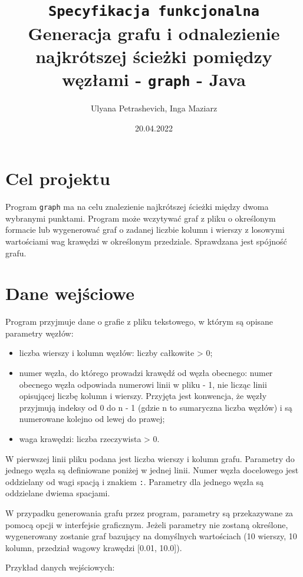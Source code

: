 \documentclass[]{article}
\title{\texttt{Specyfikacja funkcjonalna}\\Generacja grafu i odnalezienie najkrótszej ścieżki pomiędzy węzłami - \texttt{graph} - Java}
\author{Ulyana Petrashevich, Inga Maziarz}
\date{20.04.2022}
\begin{document}
\maketitle

\section{Cel projektu}\label{header-n231}

Program \texttt{graph} ma na celu znalezienie najkrótszej ścieżki między dwoma wybranymi punktami. Program może wczytywać graf z pliku o określonym formacie lub wygenerować graf o zadanej liczbie kolumn i wierszy z losowymi wartościami wag krawędzi w określonym przedziale. Sprawdzana jest spójność grafu.

\section{Dane wejściowe}\label{header-n233}

Program przyjmuje dane o grafie z pliku tekstowego, w którym są opisane parametry węzłów:

\begin{itemize}
\item
  liczba wierszy i kolumn węzłów: liczby całkowite \textgreater{} 0;
\item
  numer węzła, do którego prowadzi krawędź od węzła obecnego: numer obecnego węzła odpowiada numerowi linii w pliku - 1, nie licząc linii opisującej liczbę kolumn i wierszy. Przyjęta jest konwencja, że węzły przyjmują indeksy od 0 do n - 1 (gdzie n to sumaryczna liczba węzłów) i są numerowane kolejno od lewej do prawej; 
\item
  waga krawędzi: liczba rzeczywista \textgreater{} 0.
\end{itemize}

W pierwszej linii pliku podana jest liczba wierszy i kolumn grafu. Parametry do jednego węzła są definiowane poniżej w jednej linii. Numer węzła docelowego jest oddzielany od wagi spacją i znakiem \texttt{:}. Parametry dla jednego węzła są oddzielane dwiema spacjami.

W przypadku generowania grafu przez program, parametry są przekazywane za pomocą opcji w interfejsie graficznym. Jeżeli parametry nie zostaną określone, wygenerowany zostanie graf bazujący na domyślnych wartościach (10 wierszy, 10 kolumn, przedział wagowy krawędzi [0.01, 10.0]).



Przykład danych wejściowych:
\end{document}
